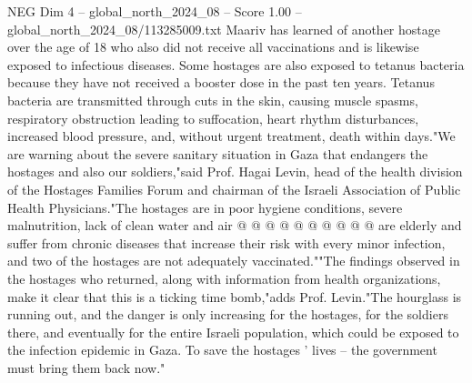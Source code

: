 \begin{textsample}{NEG Dim 4 – global\_north\_2024\_08 – Score 1.00 – global\_north\_2024\_08/113285009.txt}
Maariv has learned of another hostage over the age of 18 who also did not receive all vaccinations and is likewise exposed to infectious diseases.
Some hostages are also exposed to tetanus bacteria because they have not received a booster dose in the past ten years.
Tetanus bacteria are transmitted through cuts in the skin, causing muscle spasms, respiratory obstruction leading to suffocation, heart rhythm disturbances, increased blood pressure, and, without urgent treatment, death within days."We are warning about the severe sanitary situation in Gaza that endangers the hostages and also our soldiers,"said Prof.
Hagai Levin, head of the health division of the Hostages Families Forum and chairman of the Israeli Association of Public Health Physicians."The hostages are in poor hygiene conditions, severe malnutrition, lack of clean water and air @ @ @ @ @ @ @ @ @ @ are elderly and suffer from chronic diseases that increase their risk with every minor infection, and two of the hostages are not adequately vaccinated.""The findings observed in the hostages who returned, along with information from health organizations, make it clear that this is a ticking time bomb,"adds Prof.
Levin."The hourglass is running out, and the danger is only increasing for the hostages, for the soldiers there, and eventually for the entire Israeli population, which could be exposed to the infection epidemic in Gaza.
To save the hostages ' lives -- the government must bring them back now."

\end{textsample}
